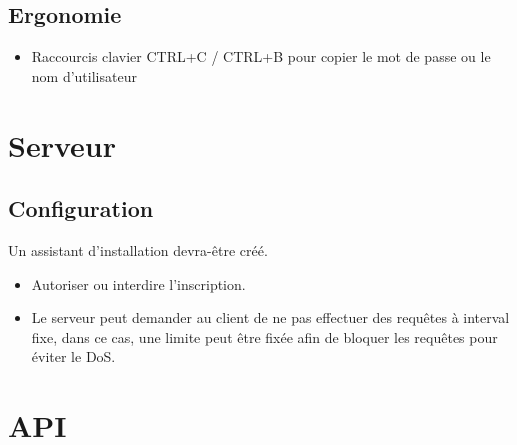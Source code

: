 \documentclass[oneside]{report}
\begin{document}
	\section{Ergonomie}{
		\begin{itemize}
			\item Raccourcis clavier CTRL+C / CTRL+B pour copier le mot de passe ou le nom d'utilisateur
		\end{itemize}
	}

	\chapter{Serveur}
	\section{Configuration}{
		\par Un assistant d'installation devra-être créé.
		\begin{itemize}
			\item Autoriser ou interdire l'inscription.
			\item Le serveur peut demander au client de ne pas effectuer des requêtes à interval fixe, dans ce cas, une limite peut être fixée afin de bloquer les requêtes pour éviter le DoS.
		\end{itemize}
	}

	\chapter{API}
\end{document}
